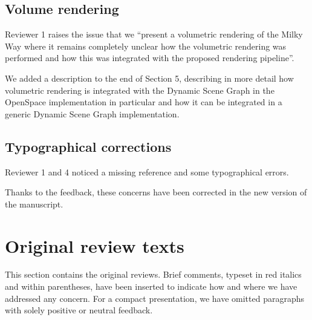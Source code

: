 \documentclass{article}
\begin{document}
\vspace*{1cm}

\begin{tcolorbox}
\subsection{Volume rendering}\label{concern:volumetric}
Reviewer 1 raises the issue that we ``present a volumetric rendering of the Milky Way where it remains completely unclear how the volumetric rendering was performed and how this was integrated with the proposed rendering pipeline''.
\end{tcolorbox}
We added a description to the end of Section 5, describing in more detail how volumetric rendering is integrated with the Dynamic Scene Graph in the OpenSpace implementation in particular and how it can be integrated in a generic Dynamic Scene Graph implementation.

\vspace*{1cm}

\begin{tcolorbox}
\subsection{Typographical corrections}\label{concern:typos}
Reviewer 1 and 4 noticed a missing reference and some typographical errors.
\end{tcolorbox}
Thanks to the feedback, these concerns have been corrected in the new version of the manuscript.



%
%
%
\section{Original review texts}
This section contains the original reviews. Brief comments, typeset in red italics and within parentheses, have been inserted to indicate how and where we have addressed any concern. For a compact presentation, we have omitted paragraphs with solely positive or neutral feedback.
%
%
\end{document}
